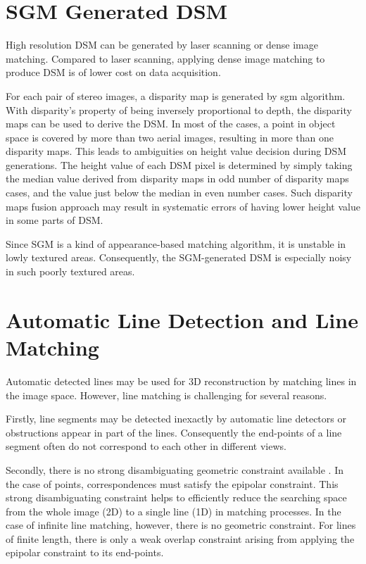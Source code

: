 \section{SGM Generated DSM}

High resolution DSM can be generated by laser scanning or dense image matching. Compared to laser scanning, applying dense image matching to produce DSM is of lower cost on data acquisition.

For each pair of stereo images, a disparity map is generated by \gls{sgm} algorithm. With disparity's property of being inversely proportional to depth, the disparity maps can be used to derive the DSM. In most of the cases, a point in object space is covered by more than two aerial images, resulting in more than one disparity maps. This leads to ambiguities on height value decision during DSM generations. The height value of each DSM pixel is determined by simply taking the median value derived from disparity maps in odd number of disparity maps cases, and the value just below the median in even number cases. Such disparity maps fusion approach may result in systematic errors of having lower height value in some parts of DSM.

Since SGM is a kind of appearance-based matching algorithm, it is unstable in lowly textured areas. Consequently, the SGM-generated DSM is especially noisy in such poorly textured areas.



\section{Automatic Line Detection and Line Matching}

Automatic detected lines may be used for 3D reconstruction by matching lines in the image space. However, line matching is challenging for several reasons.

Firstly, line segments may be detected inexactly by automatic line detectors or obstructions appear in part of the lines. Consequently the end-points of a line segment often do not correspond to each other in different views.

Secondly, there is no strong disambiguating geometric constraint available \cite{SchmidJun1997}. In the case of points, correspondences must satisfy the epipolar constraint. This strong disambiguating constraint helps to efficiently reduce the searching space from the whole image (2D) to a single line (1D) in matching processes. In the case of infinite line matching, however, there is no geometric constraint. For lines of finite length, there is only a weak overlap constraint arising from applying the epipolar constraint to its end-points.

